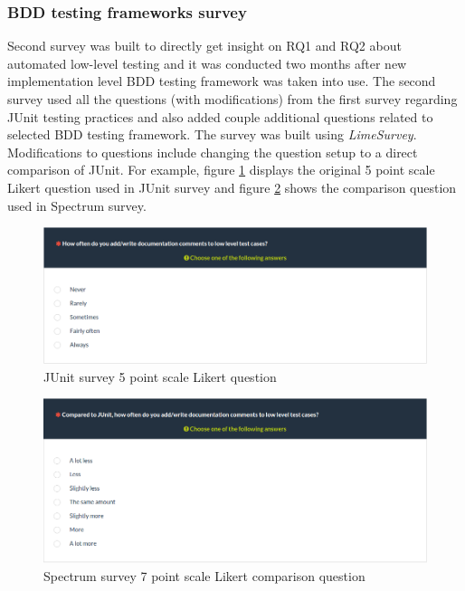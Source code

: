    \subsubsection{BDD testing frameworks survey}
    Second survey was built to directly get insight on RQ1 and RQ2 about automated low-level testing
    and it was conducted two months after new implementation level BDD testing framework was taken into use.
    The second survey used all the questions (with modifications) from the first survey regarding JUnit testing practices and
    also added couple additional questions related to selected BDD testing framework. The survey was built using \textit{LimeSurvey}.
    Modifications to questions include changing the question setup to a direct comparison of JUnit.
    For example, figure \ref{fig:survey-junit-comments} displays the original 5 point scale Likert question used in JUnit survey and
    figure \ref{fig:survey-bdd-comments} shows the comparison question used in Spectrum survey.
    \begin{figure}[H]
      \begin{center}
        \includegraphics[width=13.7cm]{images/survey-org-comments.png}
        \caption{JUnit survey 5 point scale Likert question}
        \label{fig:survey-junit-comments}
      \end{center}
    \end{figure}
    \begin{addmargin}[0em]{0em}
    \end{addmargin}
    \begin{figure}[ht]
      \begin{center}
        \includegraphics[width=13.7cm]{images/survey-bdd-comments.png}
        \caption{Spectrum survey 7 point scale Likert comparison question}
        \label{fig:survey-bdd-comments}
      \end{center}
    \end{figure}

